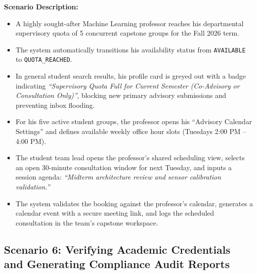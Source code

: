 \noindent\textbf{Scenario Description:}
\begin{itemize}[label=\textbf{\tiny\ensuremath{\blacksquare}}]
    \item A highly sought-after Machine Learning professor reaches his departmental supervisory quota of 5 concurrent capstone groups for the Fall 2026 term.
    \item The system automatically transitions his availability status from \texttt{AVAILABLE} to \texttt{QUOTA\_REACHED}.
    \item In general student search results, his profile card is greyed out with a badge indicating \textit{``Supervisory Quota Full for Current Semester (Co-Advisory or Consultation Only)''}, blocking new primary advisory submissions and preventing inbox flooding.
    \item For his five active student groups, the professor opens his ``Advisory Calendar Settings'' and defines available weekly office hour slots (Tuesdays 2:00 PM -- 4:00 PM).
    \item The student team lead opens the professor's shared scheduling view, selects an open 30-minute consultation window for next Tuesday, and inputs a session agenda: \textit{``Midterm architecture review and sensor calibration validation.''}
    \item The system validates the booking against the professor's calendar, generates a calendar event with a secure meeting link, and logs the scheduled consultation in the team's capstone workspace.
\end{itemize}

\subsection{Scenario 6: Verifying Academic Credentials and Generating Compliance Audit Reports}
\label{subsec:scenario6}

